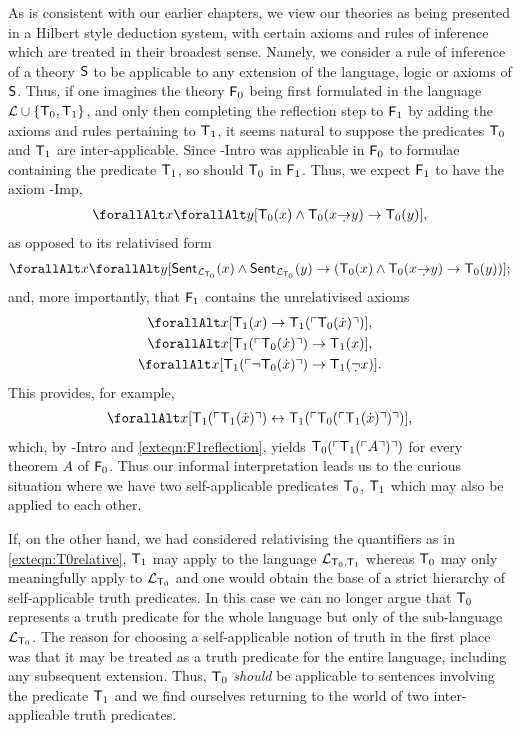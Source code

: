\documentclass[UKenglish,cleveref,DIV=12]{scrartcl}
\let\forall\forallAlt
\theoremstyle{definition}
\theoremstyle{definition}
\begin{document}
As is consistent with our earlier chapters, we view our theories as being
presented in a Hilbert style deduction system, with certain axioms and rules of inference which
are treated in their broadest sense. Namely, we consider a rule of inference of a
theory $\mathsf{S}$ to be applicable to any extension of the language, logic or
axioms of $\mathsf{S}$. Thus, if one imagines the theory $\mathsf{F}_0$ being first
formulated in the language $\mathcal{L}\cup\{\mathsf{T}_0,\mathsf{T}_1\}$, and only then completing
the reflection step to $\mathsf{F}_1$ by adding the axioms and rules pertaining to
$\mathsf{T}_1$, it seems natural to suppose the predicates $\mathsf{T}_0$ and $\mathsf{T}_1$ are
inter-applicable. Since -Intro was applicable in $\mathsf{F}_0$ to formulae
containing the predicate $\mathsf{T}_1$, so should $\mathsf{T}_0$ in $\mathsf{F}_1$. Thus, we expect
$\mathsf{F}_1$ to have the axiom -Imp,
\begin{align*}
  \forall x\forall y[ \T_0(x)\land \T_0(x\dimplies y)\rightarrow \T_0(y)],
\end{align*}
as opposed to its relativised form
\begin{align}\label{exteqn:T0relative}
  \forall x\forall y[\Sent_{\L_{\T_0}}(x)\land\Sent_{\L_{\T_0}}(y)\rightarrow ( \T_0(x)\land \T_0(x\dimplies y)\rightarrow \T_0(y))];
\end{align}
and, more importantly, that $\mathsf{F}_1$ contains the unrelativised axioms
\begin{gather}
  \forall x[\T_1(x)\rightarrow \T_1(\gn{\T_0(\dot x)})],\nonumber\\
  \forall x[\T_1(\gn{\T_0(\dot x)})\rightarrow \T_1(x)],\label{exteqn:F1ax1}\\
  \forall x[\T_1(\gn{\lnot \T_0(\dot x)})\rightarrow \T_1(\dlnot x)].\nonumber
\end{gather}
This provides, for example,
\begin{align*}
  \forall x[\T_1(\gn{\T_1(\dot x)})\equi \T_1(\gn{\T_0(\gn{\T_1(\dot x)})})],
\end{align*}
which, by -Intro and \cref{exteqn:F1reflection}, yields
$\mathsf{T}_0(\ulcorner{\mathsf{T}_1(\ulcorner{A}\urcorner)}\urcorner)$ for every theorem $A$ of $\mathsf{F}_0$. Thus our informal
interpretation leads us to the curious situation where we have two
self-applicable predicates $\mathsf{T}_0$, $\mathsf{T}_1$ which may also be applied to each other.

If, on the other hand, we had considered relativising the quantifiers as in \cref{exteqn:T0relative},
$\mathsf{T}_1$ may apply to the language $\mathcal{L}_{\mathsf{T}_0,\mathsf{T}_1}$ whereas $\mathsf{T}_0$ may only
meaningfully apply to $\mathcal{L}_{\mathsf{T}_0}$ and one would obtain the base of a strict
hierarchy of self-applicable truth predicates. In this case we can no longer
argue that $\mathsf{T}_0$ represents a truth predicate for the whole language but only of
the sub-language $\mathcal{L}_{\mathsf{T}_0}$. The reason for choosing a self-applicable
notion of truth in the first place was that it may be treated as a truth
predicate for the entire language, including any subsequent extension. Thus,
$\mathsf{T}_0$ {\em should} be applicable to sentences involving the predicate $\mathsf{T}_1$ and
we find ourselves returning to the world of two inter-applicable truth
predicates.
\end{document}
